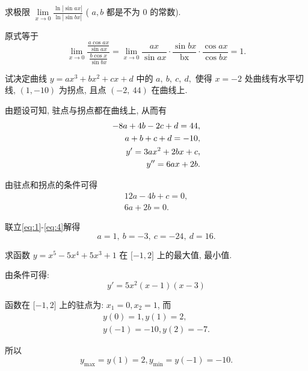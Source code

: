 \begin{problem} 求极限
$\displaystyle \lim\limits_{x \rightarrow 0}\frac{\ln\left| \sin ax \right|}{\ln\left| \sin bx \right|}$
( $a,b$ 都是不为 $0$ 的常数).

\begin{solution} 原式等于
$$\lim\limits_{x \rightarrow 0} \dfrac{\frac{a\cos ax}{\sin ax}}{\frac{b\cos x}{\sin bx}} = \lim\limits_{x \rightarrow 0}\frac{{ax}}{\sin ax} \cdot \frac{\sin bx}{\text{bx}} \cdot \frac{\cos ax}{\cos bx} = 1.$$

\end{solution}
\end{problem}

\begin{problem} 试决定曲线 $y = ax^{3} + bx^{2} + cx + d$ 中的 $a,\ b,\ c,\ d,$
使得 $x = - 2$ 处曲线有水平切线, $(1, - 10)$ 为拐点, 且点
$( - 2,\ 44)$ 在曲线上.

\begin{solution} 由题设可知, 驻点与拐点都在曲线上, 从而有
\begin{eqnarray}
- 8a + 4b - 2c + d = 44,\label{eq:1}\\
a + b + c + d = - 10,\label{eq:2}\\
y' = 3ax^{2} + 2bx + c,\notag\\
y'' = 6ax + 2b.\notag
\end{eqnarray}

由驻点和拐点的条件可得
\begin{eqnarray}
12a - 4b + c = 0,\label{eq:3}\\
6a + 2b = 0.\label{eq:4}
\end{eqnarray}

联立\eqref{eq:1}-\eqref{eq:4}解得
$$a = 1,\ b = - 3,\ c = - 24,\ d = 16.$$

\end{solution}

\end{problem}

\begin{problem} 求函数 $y = x^{5} - 5x^{4} + 5x^{3} + 1$ 在
$\lbrack - 1,2\rbrack$ 上的最大值, 最小值.

\begin{solution} 由条件可得:
$$y' = 5x^{2}\left( x - 1 \right)\left( x - 3 \right)$$

函数在 $\lbrack - 1,2\rbrack$ 上的驻点为: $x_{1} = 0,x_{2} = 1$, 而
\begin{eqnarray}
y\left( 0 \right) = 1,y\left( 1 \right) = 2,\\
y\left( - 1 \right) = - 10,y\left( 2 \right) = - 7.
\end{eqnarray}

所以
$$y_{\max} = y\left( 1 \right) = 2,y_{\min} = y\left( - 1 \right) = - 10.$$

\end{solution}\end{problem}

